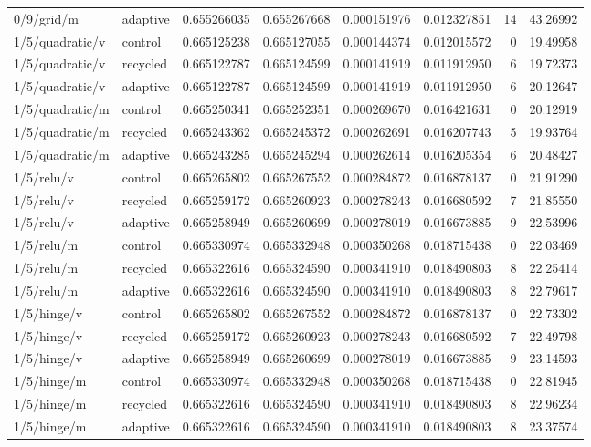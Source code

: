 \begin{longtable}{llrrrrrr}
0/9/grid/m & adaptive & 0.655266035 & 0.655267668 & 0.000151976 & 0.012327851 & 14 & 43.26992 \\
1/5/quadratic/v & control & 0.665125238 & 0.665127055 & 0.000144374 & 0.012015572 & 0 & 19.49958 \\
1/5/quadratic/v & recycled & 0.665122787 & 0.665124599 & 0.000141919 & 0.011912950 & 6 & 19.72373 \\
1/5/quadratic/v & adaptive & 0.665122787 & 0.665124599 & 0.000141919 & 0.011912950 & 6 & 20.12647 \\
1/5/quadratic/m & control & 0.665250341 & 0.665252351 & 0.000269670 & 0.016421631 & 0 & 20.12919 \\
1/5/quadratic/m & recycled & 0.665243362 & 0.665245372 & 0.000262691 & 0.016207743 & 5 & 19.93764 \\
1/5/quadratic/m & adaptive & 0.665243285 & 0.665245294 & 0.000262614 & 0.016205354 & 6 & 20.48427 \\
1/5/relu/v & control & 0.665265802 & 0.665267552 & 0.000284872 & 0.016878137 & 0 & 21.91290 \\
1/5/relu/v & recycled & 0.665259172 & 0.665260923 & 0.000278243 & 0.016680592 & 7 & 21.85550 \\
1/5/relu/v & adaptive & 0.665258949 & 0.665260699 & 0.000278019 & 0.016673885 & 9 & 22.53996 \\
1/5/relu/m & control & 0.665330974 & 0.665332948 & 0.000350268 & 0.018715438 & 0 & 22.03469 \\
1/5/relu/m & recycled & 0.665322616 & 0.665324590 & 0.000341910 & 0.018490803 & 8 & 22.25414 \\
1/5/relu/m & adaptive & 0.665322616 & 0.665324590 & 0.000341910 & 0.018490803 & 8 & 22.79617 \\
1/5/hinge/v & control & 0.665265802 & 0.665267552 & 0.000284872 & 0.016878137 & 0 & 22.73302 \\
1/5/hinge/v & recycled & 0.665259172 & 0.665260923 & 0.000278243 & 0.016680592 & 7 & 22.49798 \\
1/5/hinge/v & adaptive & 0.665258949 & 0.665260699 & 0.000278019 & 0.016673885 & 9 & 23.14593 \\
1/5/hinge/m & control & 0.665330974 & 0.665332948 & 0.000350268 & 0.018715438 & 0 & 22.81945 \\
1/5/hinge/m & recycled & 0.665322616 & 0.665324590 & 0.000341910 & 0.018490803 & 8 & 22.96234 \\
1/5/hinge/m & adaptive & 0.665322616 & 0.665324590 & 0.000341910 & 0.018490803 & 8 & 23.37574 \\

\end{longtable}
